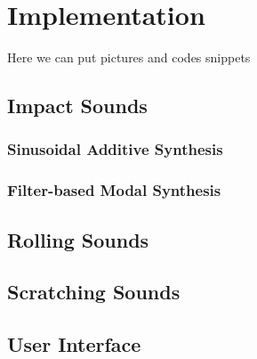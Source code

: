 \chapter{Implementation}\label{ch:implementation}

Here we can put pictures and codes snippets


\section{Impact Sounds}


\subsection{Sinusoidal Additive Synthesis}

\subsection{Filter-based Modal Synthesis}

\section{Rolling Sounds}

\section{Scratching Sounds}

\section{User Interface}
